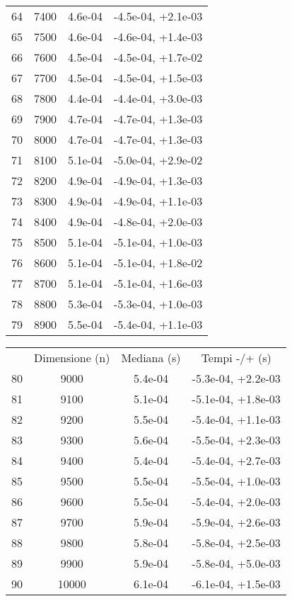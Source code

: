 \begin{table}
\begin{adjustbox}{width=1\textwidth/2}
\begin{tabular}{|c|c|c|c|}
\cline{1-4}
64 & 7400 & 4.6e-04 & -4.5e-04, +2.1e-03 \\
\cline{1-4}
65 & 7500 & 4.6e-04 & -4.6e-04, +1.4e-03 \\
\cline{1-4}
66 & 7600 & 4.5e-04 & -4.5e-04, +1.7e-02 \\
\cline{1-4}
67 & 7700 & 4.5e-04 & -4.5e-04, +1.5e-03 \\
\cline{1-4}
68 & 7800 & 4.4e-04 & -4.4e-04, +3.0e-03 \\
\cline{1-4}
69 & 7900 & 4.7e-04 & -4.7e-04, +1.3e-03 \\
\cline{1-4}
70 & 8000 & 4.7e-04 & -4.7e-04, +1.3e-03 \\
\cline{1-4}
71 & 8100 & 5.1e-04 & -5.0e-04, +2.9e-02 \\
\cline{1-4}
72 & 8200 & 4.9e-04 & -4.9e-04, +1.3e-03 \\
\cline{1-4}
73 & 8300 & 4.9e-04 & -4.9e-04, +1.1e-03 \\
\cline{1-4}
74 & 8400 & 4.9e-04 & -4.8e-04, +2.0e-03 \\
\cline{1-4}
75 & 8500 & 5.1e-04 & -5.1e-04, +1.0e-03 \\
\cline{1-4}
76 & 8600 & 5.1e-04 & -5.1e-04, +1.8e-02 \\
\cline{1-4}
77 & 8700 & 5.1e-04 & -5.1e-04, +1.6e-03 \\
\cline{1-4}
78 & 8800 & 5.3e-04 & -5.3e-04, +1.0e-03 \\
\cline{1-4}
79 & 8900 & 5.5e-04 & -5.4e-04, +1.1e-03 \\
\cline{1-4}
\end{tabular}
\end{adjustbox}
\end{table}

\begin{table}
\centering
\begin{adjustbox}{width=1\textwidth/2}
\begin{tabular}{|c|c|c|c|}
\hline
 & Dimensione (n) & Mediana (s) & Tempi -/+ (s) \\
80 & 9000 & 5.4e-04 & -5.3e-04, +2.2e-03 \\
\cline{1-4}
81 & 9100 & 5.1e-04 & -5.1e-04, +1.8e-03 \\
\cline{1-4}
82 & 9200 & 5.5e-04 & -5.4e-04, +1.1e-03 \\
\cline{1-4}
83 & 9300 & 5.6e-04 & -5.5e-04, +2.3e-03 \\
\cline{1-4}
84 & 9400 & 5.4e-04 & -5.4e-04, +2.7e-03 \\
\cline{1-4}
85 & 9500 & 5.5e-04 & -5.5e-04, +1.0e-03 \\
\cline{1-4}
86 & 9600 & 5.5e-04 & -5.4e-04, +2.0e-03 \\
\cline{1-4}
87 & 9700 & 5.9e-04 & -5.9e-04, +2.6e-03 \\
\cline{1-4}
88 & 9800 & 5.8e-04 & -5.8e-04, +2.5e-03 \\
\cline{1-4}
89 & 9900 & 5.9e-04 & -5.8e-04, +5.0e-03 \\
\cline{1-4}
90 & 10000 & 6.1e-04 & -6.1e-04, +1.5e-03 \\
\cline{1-4}
\end{tabular}
\end{adjustbox}
\end{table}
